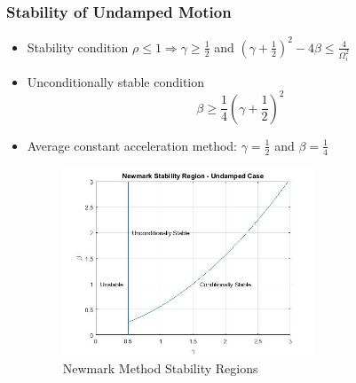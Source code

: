 \documentclass[xcolor=svgnames,9pt]{beamer}
\theoremstyle{remark}
\begin{document}
		\begin{frame}
  			\frametitle{Stability of Undamped Motion}
			\begin{itemize}
				\item Stability condition $\rho \leq 1 \Rightarrow \gamma \geq \frac{1}{2}$ and $(\gamma + \frac{1}{2})^2 - 4\beta \leq \frac{4}{\Omega_i^2}$
				\item Unconditionally stable condition
					\begin{equation}
						\beta \geq \frac{1}{4}\left(\gamma + \frac{1}{2}\right)^2
					\end{equation}
				\item Average constant acceleration method: $\gamma = \frac{1}{2}$ and $\beta = \frac{1}{4}$ 
				\begin{figure}[h!]
   					 \centering
   					 \includegraphics[width=75mm]{pictures/GraphNM.jpg}
   					 \caption{Newmark Method Stability Regions}
				            \label{GraphNM}
  				\end{figure}
			\end{itemize}
		\end{frame}
\end{document}
